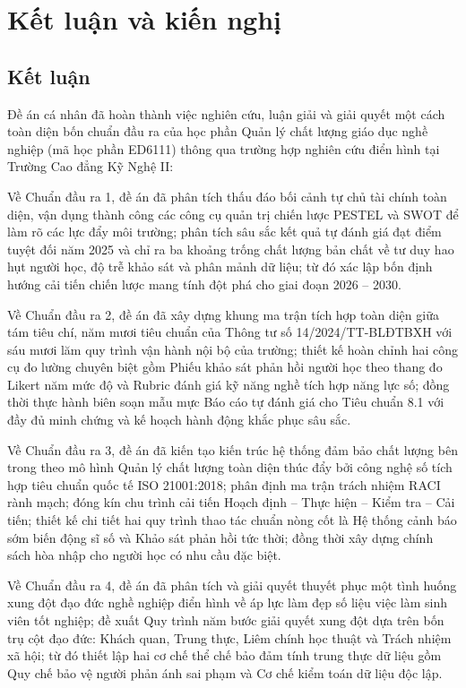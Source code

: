 \section{Kết luận và kiến nghị}

\subsection{Kết luận}

Đề án cá nhân đã hoàn thành việc nghiên cứu, luận giải và giải quyết một cách toàn diện bốn chuẩn đầu ra của học phần Quản lý chất lượng giáo dục nghề nghiệp (mã học phần ED6111) thông qua trường hợp nghiên cứu điển hình tại Trường Cao đẳng Kỹ Nghệ II:

Về Chuẩn đầu ra 1, đề án đã phân tích thấu đáo bối cảnh tự chủ tài chính toàn diện, vận dụng thành công các công cụ quản trị chiến lược PESTEL và SWOT để làm rõ các lực đẩy môi trường; phân tích sâu sắc kết quả tự đánh giá đạt điểm tuyệt đối năm 2025 và chỉ ra ba khoảng trống chất lượng bản chất về tư duy hao hụt người học, độ trễ khảo sát và phân mảnh dữ liệu; từ đó xác lập bốn định hướng cải tiến chiến lược mang tính đột phá cho giai đoạn 2026 -- 2030.

Về Chuẩn đầu ra 2, đề án đã xây dựng khung ma trận tích hợp toàn diện giữa tám tiêu chí, năm mươi tiêu chuẩn của Thông tư số 14/2024/TT-BLĐTBXH với sáu mươi lăm quy trình vận hành nội bộ của trường; thiết kế hoàn chỉnh hai công cụ đo lường chuyên biệt gồm Phiếu khảo sát phản hồi người học theo thang đo Likert năm mức độ và Rubric đánh giá kỹ năng nghề tích hợp năng lực số; đồng thời thực hành biên soạn mẫu mực Báo cáo tự đánh giá cho Tiêu chuẩn 8.1 với đầy đủ minh chứng và kế hoạch hành động khắc phục sâu sắc.

Về Chuẩn đầu ra 3, đề án đã kiến tạo kiến trúc hệ thống đảm bảo chất lượng bên trong theo mô hình Quản lý chất lượng toàn diện thúc đẩy bởi công nghệ số tích hợp tiêu chuẩn quốc tế ISO 21001:2018; phân định ma trận trách nhiệm RACI rành mạch; đóng kín chu trình cải tiến Hoạch định -- Thực hiện -- Kiểm tra -- Cải tiến; thiết kế chi tiết hai quy trình thao tác chuẩn nòng cốt là Hệ thống cảnh báo sớm biến động sĩ số và Khảo sát phản hồi tức thời; đồng thời xây dựng chính sách hòa nhập cho người học có nhu cầu đặc biệt.

Về Chuẩn đầu ra 4, đề án đã phân tích và giải quyết thuyết phục một tình huống xung đột đạo đức nghề nghiệp điển hình về áp lực làm đẹp số liệu việc làm sinh viên tốt nghiệp; đề xuất Quy trình năm bước giải quyết xung đột dựa trên bốn trụ cột đạo đức: Khách quan, Trung thực, Liêm chính học thuật và Trách nhiệm xã hội; từ đó thiết lập hai cơ chế thể chế bảo đảm tính trung thực dữ liệu gồm Quy chế bảo vệ người phản ánh sai phạm và Cơ chế kiểm toán dữ liệu độc lập.

